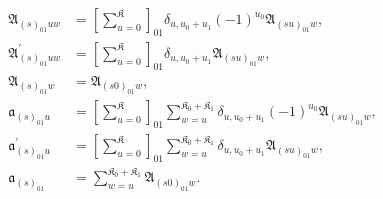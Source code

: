 \begin{align}
\mathfrak{A}_{\left(s\right)_{01}uw}
    &=
        \left[ \sum_{u=0}^{\mathfrak{K}} \right]_{01}
        \delta_{u,u_{0}+u_{1}}
        \left(-1\right)^{u_{0}}
        \mathfrak{A}_{\left(su\right)_{01}w}
,\\
\mathfrak{A}_{\left(s\right)_{01}uw}^{\prime}
    &=
        \left[ \sum_{u=0}^{\mathfrak{K}} \right]_{01}
        \delta_{u,u_{0}+u_{1}}
        \mathfrak{A}_{\left(su\right)_{01}w}
,\\
\mathfrak{A}_{\left(s\right)_{01}w}
    &=
        \mathfrak{A}_{\left(s0\right)_{01}w}
,\\
\mathfrak{a}_{\left(s\right)_{01}u}
    &=
        \left[ \sum_{u=0}^{\mathfrak{K}} \right]_{01}
        \sum_{w=u}^{\mathfrak{K}_{0}+\mathfrak{K}_{1}}
        \delta_{u,u_{0}+u_{1}}
        \left(-1\right)^{u_{0}}
        \mathfrak{A}_{\left(su\right)_{01}w}
,\\
\mathfrak{a}_{\left(s\right)_{01}u}^{\prime}
    &=
        \left[ \sum_{u=0}^{\mathfrak{K}} \right]_{01}
        \sum_{w=u}^{\mathfrak{K}_{0}+\mathfrak{K}_{1}}
        \delta_{u,u_{0}+u_{1}}
        \mathfrak{A}_{\left(su\right)_{01}w}
,\\
\mathfrak{a}_{\left(s\right)_{01}}
    &=
        \sum_{w=u}^{\mathfrak{K}_{0}+\mathfrak{K}_{1}}
        \mathfrak{A}_{\left(s0\right)_{01}w}
.
\end{align}
    